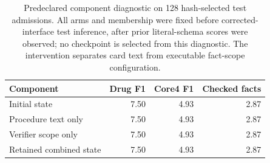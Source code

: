 \begin{table}[t]\centering\small
\setlength{\tabcolsep}{4pt}
\caption{Predeclared component diagnostic on 128 hash-selected test admissions. All arms and membership were fixed before corrected-interface test inference, after prior literal-schema scores were observed; no checkpoint is selected from this diagnostic. The intervention separates card text from executable fact-scope configuration.}
\label{tab:order-components}
\begin{tabular}{@{}lrrr@{}}\toprule
Component & Drug F1 & Core4 F1 & Checked facts\\\midrule
Initial state & 7.50 & 4.93 & 2.87\\
Procedure text only & 7.50 & 4.93 & 2.87\\
Verifier scope only & 7.50 & 4.93 & 2.87\\
Retained combined state & 7.50 & 4.93 & 2.87\\
\bottomrule\end{tabular}

\end{table}

